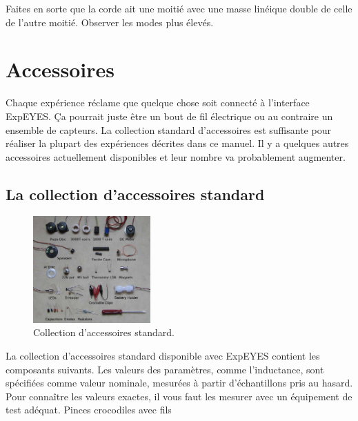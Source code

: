 \documentclass{book}
\begin{document}
Faites en sorte que la corde ait une moitié avec une masse linéique double de celle de l'autre moitié. Observer les modes plus élevés.










\chapter{Accessoires}


Chaque expérience réclame que quelque chose soit connecté à l'interface ExpEYES. Ça pourrait juste être un bout de fil électrique ou au contraire un ensemble de capteurs. La collection standard d'accessoires est suffisante pour réaliser la plupart des expériences décrites dans ce manuel. Il y a quelques autres accessoires actuellement disponibles et leur nombre va probablement augmenter.




\section{La collection d'accessoires standard}





\begin{figure}[h!]
\begin{center}
\caption{\label{fig:Standard-Accessory-set}Collection d'accessoires standard. }\vspace{0.5em}
\includegraphics[width=0.4\textwidth, height=0.3\textwidth, keepaspectratio]{Pic-std-accessory-photo.png}
\end{center}
\end{figure}






La collection d'accessoires standard disponible avec ExpEYES contient les composants suivants. Les valeurs des paramètres, comme l'inductance, sont spécifiées comme valeur nominale, mesurées à partir d'échantillons pris au hasard. Pour connaître les valeurs exactes, il vous faut les mesurer avec un équipement de test adéquat.
Pinces crocodiles avec fils
\end{document}
